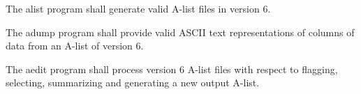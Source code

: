 \begin{description}

 The \acs{alist} program shall generate valid \acs{A-list} files in
version 6.



 The \acs{adump} program shall provide valid ASCII text representations
of columns of data from an \acs{A-list} of version 6.

 The \acs{aedit} program shall process version 6 \acs{A-list}
files with respect to flagging, selecting, summarizing and generating a new
output \acs{A-list}.






%
%
%
%



%

\end{description}


